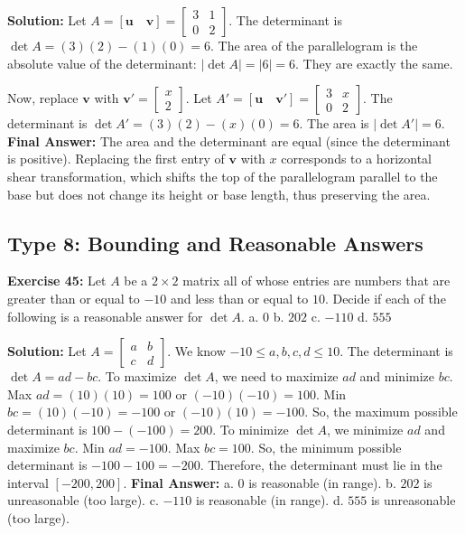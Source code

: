 \documentclass{article}
\begin{document}
\textbf{Solution:}
Let $A = [\mathbf{u} \quad \mathbf{v}] = \begin{bmatrix} 3 & 1 \\ 0 & 2 \end{bmatrix}$.
The determinant is $\det A = (3)(2) - (1)(0) = 6$.
The area of the parallelogram is the absolute value of the determinant: $|\det A| = |6| = 6$. They are exactly the same.

Now, replace $\mathbf{v}$ with $\mathbf{v}' = \begin{bmatrix} x \\ 2 \end{bmatrix}$.
Let $A' = [\mathbf{u} \quad \mathbf{v}'] = \begin{bmatrix} 3 & x \\ 0 & 2 \end{bmatrix}$.
The determinant is $\det A' = (3)(2) - (x)(0) = 6$.
The area is $|\det A'| = 6$.
\textbf{Final Answer:} The area and the determinant are equal (since the determinant is positive). Replacing the first entry of $\mathbf{v}$ with $x$ corresponds to a horizontal shear transformation, which shifts the top of the parallelogram parallel to the base but does not change its height or base length, thus preserving the area.

\subsection{Type 8: Bounding and Reasonable Answers}

\textbf{Exercise 45:} Let $A$ be a $2 \times 2$ matrix all of whose entries are numbers that are greater than or equal to $-10$ and less than or equal to $10$. Decide if each of the following is a reasonable answer for $\det A$.
a. $0$ \quad b. $202$ \quad c. $-110$ \quad d. $555$

\textbf{Solution:}
Let $A = \begin{bmatrix} a & b \\ c & d \end{bmatrix}$. We know $-10 \le a,b,c,d \le 10$.
The determinant is $\det A = ad - bc$.
To maximize $\det A$, we need to maximize $ad$ and minimize $bc$.
Max $ad = (10)(10) = 100$ or $(-10)(-10) = 100$.
Min $bc = (10)(-10) = -100$ or $(-10)(10) = -100$.
So, the maximum possible determinant is $100 - (-100) = 200$.
To minimize $\det A$, we minimize $ad$ and maximize $bc$.
Min $ad = -100$. Max $bc = 100$.
So, the minimum possible determinant is $-100 - 100 = -200$.
Therefore, the determinant must lie in the interval $[-200, 200]$.
\textbf{Final Answer:} 
a. $0$ is reasonable (in range).
b. $202$ is unreasonable (too large).
c. $-110$ is reasonable (in range).
d. $555$ is unreasonable (too large).
\end{document}

